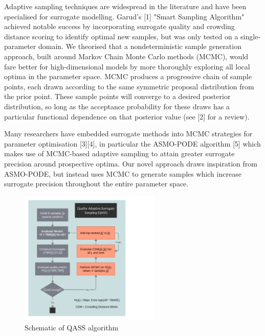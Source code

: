 Adaptive sampling techniques are widespread in the literature and have been specialised for surrogate modelling. Garud's [1] "Smart Sampling Algorithm" achieved notable success by incorporating surrogate quality and crowding distance scoring to identify optimal new samples, but was only tested on a single-parameter domain. We theorised that a nondeterministic sample generation approach, built around Markov Chain Monte Carlo methods (MCMC), would fare better for high-dimensional models by more thoroughly exploring all local optima in the parameter space. MCMC produces a progressive chain of sample points, each drawn according to the same symmetric proposal distribution from the prior point. These sample points will converge to a desired posterior distribution, so long as the acceptance probability for these draws has a particular functional dependence on that posterior value (see [2] for a review). 

Many researchers have embedded surrogate methods into MCMC strategies for parameter optimisation [3][4], in particular the ASMO-PODE algorithm [5] which makes use of MCMC-based adaptive sampling to attain greater surrogate precision around prospective optima. Our novel approach draws inspiration from ASMO-PODE, but instead uses MCMC to generate samples which increase surrogate precision throughout the entire parameter space.

\begin{figure}
  \vspace{-35pt}
  \begin{center}
    \includegraphics[width=0.6\textwidth]{fig4_qassplan.png}
    \caption{Schematic of QASS algorithm}
    \label{fig:qassplan}
  \end{center}
  \vspace{-20pt}
\end{figure}

